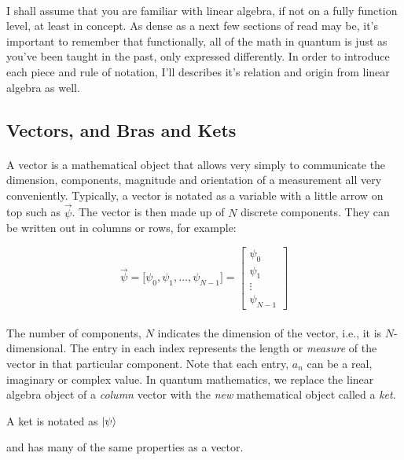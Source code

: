 \documentclass[12pt,letterpaper]{book}
\begin{document}
\paragraph*{}I shall assume that you are familiar with linear algebra, if not on a fully function level, at least in concept. As dense as a next few sections of read may be, it's important to remember that functionally, all of the math in quantum is just as you've been taught in the past, only expressed differently. In order to introduce each piece and rule of notation, I'll describes it's relation and origin from linear algebra as well.


\subsection*{Vectors, and Bras and Kets}

\paragraph*{}A vector is a mathematical object that allows very simply to communicate the dimension, components, magnitude and orientation of a measurement all very conveniently. Typically, a vector is notated as a variable with a little arrow on top such as $\vec{\psi}$. The vector is then made up of $N$ discrete components. They can be written out in columns or rows, for example:

\begin{equation}
\label{vector}
\vec{\psi} = \big[ \psi_0 , \psi_1 , \hdots , \psi_{N-1} ] =
\begin{bmatrix}
\psi_0 \\ \psi_1  \\ \vdots \\ \psi_{N-1}
\end{bmatrix}
\end{equation}

\paragraph*{}The number of components, $N$ indicates the dimension of the vector, i.e., it is $N$-dimensional. The entry in each index represents the length or \textit{measure} of the vector in that particular component. Note that each entry, $a_n$ can be a real, imaginary or complex value. In quantum mathematics, we replace the linear algebra object of a \textit{column} vector with the \textit{new} mathematical object called a \textit{ket}.
\begin{center}
A ket is notated as $\ket{\psi}$ 
\end{center} 
and has many of the same properties as a vector.
\end{document}
